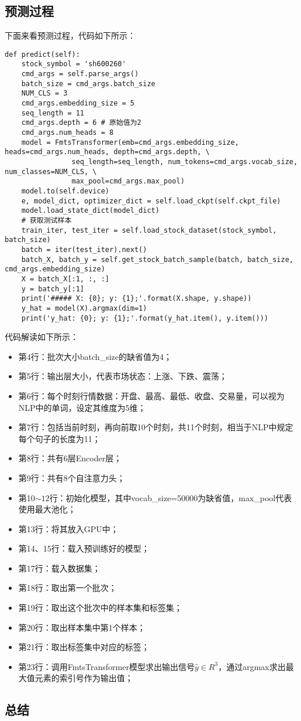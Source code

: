\subsection{预测过程}
下面来看预测过程，代码如下所示：
\begin{lstlisting}
def predict(self):
    stock_symbol = 'sh600260'
    cmd_args = self.parse_args()
    batch_size = cmd_args.batch_size
    NUM_CLS = 3
    cmd_args.embedding_size = 5
    seq_length = 11
    cmd_args.depth = 6 # 原始值为2
    cmd_args.num_heads = 8
    model = FmtsTransformer(emb=cmd_args.embedding_size, heads=cmd_args.num_heads, depth=cmd_args.depth, \
                seq_length=seq_length, num_tokens=cmd_args.vocab_size, num_classes=NUM_CLS, \
                max_pool=cmd_args.max_pool)
    model.to(self.device)
    e, model_dict, optimizer_dict = self.load_ckpt(self.ckpt_file)
    model.load_state_dict(model_dict)
    # 获取测试样本
    train_iter, test_iter = self.load_stock_dataset(stock_symbol, batch_size)
    batch = iter(test_iter).next()
    batch_X, batch_y = self.get_stock_batch_sample(batch, batch_size, cmd_args.embedding_size)
    X = batch_X[:1, :, :]
    y = batch_y[:1]
    print('##### X: {0}; y: {1};'.format(X.shape, y.shape))
    y_hat = model(X).argmax(dim=1)
    print('y_hat: {0}; y: {1};'.format(y_hat.item(), y.item()))
\end{lstlisting}
代码解读如下所示：
\begin{itemize}
    \item 第4行：批次大小batch\_size的缺省值为4；
    \item 第5行：输出层大小，代表市场状态：上涨、下跌、震荡；
    \item 第6行：每个时刻行情数据：开盘、最高、最低、收盘、交易量，可以视为NLP中的单词，设定其维度为5维；
    \item 第7行：包括当前时刻，再向前取10个时刻，共11个时刻，相当于NLP中规定每个句子的长度为11；
    \item 第8行：共有6层Encoder层；
    \item 第9行：共有8个自注意力头；
    \item 第10$\sim12$行：初始化模型，其中vocab\_size=50000为缺省值，max\_pool代表使用最大池化；
    \item 第13行：将其放入GPU中；
    \item 第14、15行：载入预训练好的模型；
    \item 第17行：载入数据集；
    \item 第18行：取出第一个批次；
    \item 第19行：取出这个批次中的样本集和标签集；
    \item 第20行：取出样本集中第1个样本；
    \item 第21行：取出标签集中对应的标签；
    \item 第23行：调用FmtsTransformer模型求出输出信号$\hat{y} \in R^{3}$，通过argmax求出最大值元素的索引号作为输出值；
\end{itemize}

\subsection{总结}
